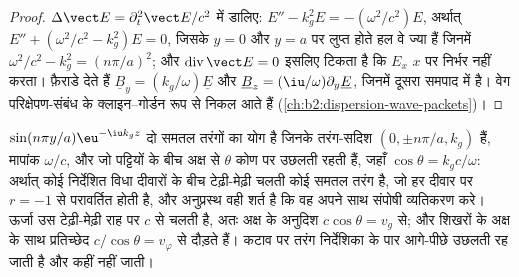 \begin{proof}
$\Delta\vect E = \partial_t^2\vect E/c^2$ में डालिए: $E'' - k_g^2E = -(\omega^2/c^2)E$, अर्थात्
$E'' + (\omega^2/c^2 - k_g^2)E = 0$, जिसके $y = 0$ और
$y = a$ पर लुप्त होते हल वे ज्या हैं जिनमें $\omega^2/c^2 - k_g^2 = (n\pi/a)^2$; और $\operatorname{div}
\vect E = 0$ इसलिए टिकता है कि $E_x$ $x$ पर निर्भर नहीं करता। फ़ैराडे देते हैं
$\underline B_y = (k_g/\omega)\underline E$ और $\underline B_z = (\iu/\omega)\partial_y\underline E$, जिनमें दूसरा
समपाद में है। वेग परिक्षेपण-संबंध के क्लाइन--गोर्डन रूप से निकल आते हैं
(\cref{ch:b2:dispersion-wave-packets})।
\end{proof}

\begin{remark}\label{rem:b2:guided-waves:zigzag}
$\sin(n\pi y/a)\eu^{-\iu k_gz}$ दो समतल तरंगों का योग है जिनके
तरंग-सदिश $(0, \pm n\pi/a, k_g)$ हैं, मापांक $\omega/c$, और जो
पट्टियों के बीच अक्ष से $\theta$ कोण पर उछलती रहती हैं, जहाँ $\cos\theta = k_gc/\omega$:
अर्थात् कोई निर्देशित विधा दीवारों के बीच टेढ़ी-मेढ़ी चलती कोई समतल तरंग है, जो हर
दीवार पर $r = -1$ से परावर्तित होती है, और अनुप्रस्थ  वही
शर्त है कि वह अपने साथ संपोषी व्यतिकरण करे। ऊर्जा
उस टेढ़ी-मेढ़ी राह पर $c$ से चलती है, अतः अक्ष के अनुदिश $c\cos\theta = v_g$ से;
और शिखरों के अक्ष के साथ प्रतिच्छेद $c/\cos\theta = v_\varphi$ से दौड़ते हैं। कटाव
पर तरंग निर्देशिका के पार आगे-पीछे उछलती रह जाती है और कहीं नहीं
जाती।
\end{remark}

